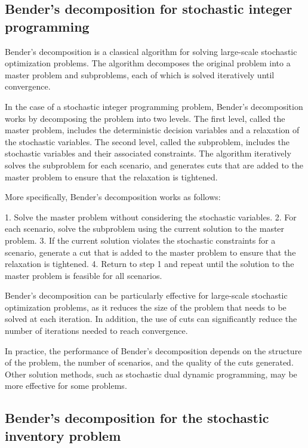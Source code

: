 \subsection*{Bender's decomposition for stochastic integer programming}

Bender's decomposition is a classical algorithm for solving large-scale stochastic optimization problems. The algorithm decomposes the original problem into a master problem and subproblems, each of which is solved iteratively until convergence.

In the case of a stochastic integer programming problem, Bender's decomposition works by decomposing the problem into two levels. The first level, called the master problem, includes the deterministic decision variables and a relaxation of the stochastic variables. The second level, called the subproblem, includes the stochastic variables and their associated constraints. The algorithm iteratively solves the subproblem for each scenario, and generates cuts that are added to the master problem to ensure that the relaxation is tightened.

More specifically, Bender's decomposition works as follows:

1. Solve the master problem without considering the stochastic variables.
2. For each scenario, solve the subproblem using the current solution to the master problem.
3. If the current solution violates the stochastic constraints for a scenario, generate a cut that is added to the master problem to ensure that the relaxation is tightened.
4. Return to step 1 and repeat until the solution to the master problem is feasible for all scenarios.

Bender's decomposition can be particularly effective for large-scale stochastic optimization problems, as it reduces the size of the problem that needs to be solved at each iteration. In addition, the use of cuts can significantly reduce the number of iterations needed to reach convergence.

In practice, the performance of Bender's decomposition depends on the structure of the problem, the number of scenarios, and the quality of the cuts generated. Other solution methods, such as stochastic dual dynamic programming, may be more effective for some problems.


\subsection*{Bender's decomposition for the stochastic inventory problem}

